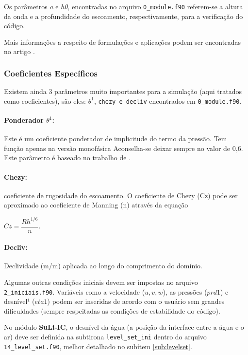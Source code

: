 \documentclass[12pt, a4paper]{article}
\newcommand{\SLIC}{{\bf SuLi-IC}}
\begin{document}
Os parâmetros \textit{a} e \textit{h0}, encontradas no arquivo \verb|0_module.f90| referem-se a altura da onda e a profundidade do escoamento, respectivamente, para a verificação do código.

Mais informações a respeito de formulações e aplicações podem ser encontradas no artigo \cite{monteiro2019}.

\subsubsection{Coeficientes Específicos}
Existem ainda 3 parâmetros muito importantes para a simulação (aqui tratados como coeficientes), são eles: $\theta^1$,  \verb|chezy e decliv| encontrados em \verb|0_module.f90|.

\paragraph{Ponderador $\theta^1$:} Este é um coeficiente ponderador de implicitude do termo da pressão. Tem função apenas na versão monofásica Aconselha-se deixar sempre no valor de 0,6. Este parâmetro é baseado no trabalho de \cite{patnaik1987}.
\paragraph{Chezy:} coeficiente de rugosidade do escoamento. O coeficiente de Chezy (Cz) pode ser aproximado ao coeficiente de Manning (n) através da equação

\begin{center}
$Cz = \dfrac{Rh^{1/6}}{n}.$
\end{center}

\paragraph{Decliv:} Declividade (m/m) aplicada ao longo do comprimento do domínio.
\linebreak

Algumas outras condições iniciais devem ser impostas no arquivo \verb|2_iniciais.f90|. Variáveis como a velocidade ($u,v,w$), as pressões ($prd1$) e desnível¹ ($eta1$)  podem ser inseridas de acordo com o usuário sem grandes dificuldades (sempre respeitadas as condições de estabilidade do código).

No módulo \SLIC, o desnível da água (a posição da interface entre a água e o ar) deve ser definida na subtirona \verb|level_set_ini| dentro do arquivo \verb|14_level_set.f90|, melhor detalhado no subítem \ref{sub:levelset}.
\end{document}
